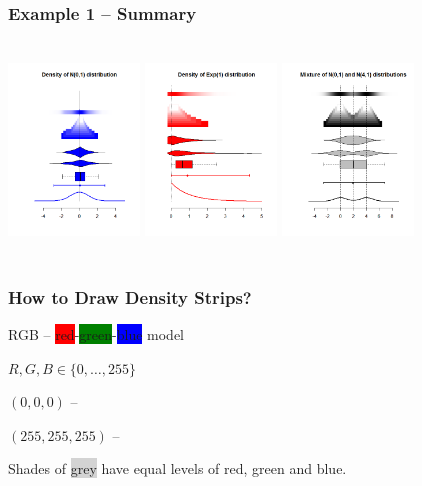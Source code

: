\documentclass[11pt,usenames,dvipsnames,svgnames,x11names]{beamer}
\theoremstyle{plain}
\theoremstyle{definition}
\theoremstyle{remark}
\begin{document}
\begin{frame}
	\frametitle{Example 1 -- Summary}
	\begin{columns}[t]
			\centering
			\includegraphics[width=3.5cm,height=5cm]{a.png}
			\centering
			\includegraphics[width=3.5cm,height=5cm]{b.png}
			\centering
			\includegraphics[width=3.5cm,height=5cm]{c.png}
	\end{columns}
\end{frame}

\begin{frame}
	\frametitle{How to Draw Density Strips?}
	
	RGB -- \colorbox{red}{red}-\colorbox{green}{green}-\colorbox{blue}{blue} model
	
	\bigskip
	
	$R,G,B \in \lbrace 0,\ldots,255 \rbrace$
	
	\bigskip
	
	$(0,0,0)$ -- \colorbox{black}{\color{white}{black}}
	
	\bigskip
	
	$(255,255,255)$ -- 
	
	\bigskip
	
	Shades of \colorbox{lightgray}{grey} have equal levels of red, green and blue.
	
\end{frame}
\end{document}
